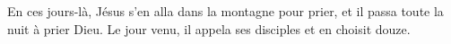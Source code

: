 En ces jours-là, Jésus s’en alla dans la montagne pour prier,
	et il passa toute la nuit à prier Dieu.
Le jour venu, il appela ses disciples et en choisit douze.

